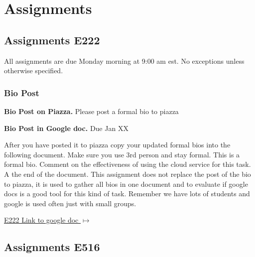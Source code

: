 \chapter{Assignments}\label{c:assignments}

\section{Assignments E222}
\label{s:e222-assignments}

All assignments are due Monday morning at 9:00 am est. No exceptions unless otherwise specified.  

\subsection{Bio Post}

\begin{exercise}\label{a:e222-bio-piazza}

{\bf Bio Post on Piazza.} Please post a formal bio to piazza

\end{exercise}
 
\begin{exercise} \label{a:e222-bio-googledocs}

{\bf Bio Post in Google doc.} Due Jan XX

After you have posted it to piazza copy your updated formal bios into the following document.  Make sure you use 3rd person and stay formal. This is a formal bio. Comment on the effectiveness of using the cloud service for this task. A the end of the document. This assignment does not replace the post of the bio to piazza, it is used to gather all bios in one document and to evaluate if google docs is a good tool for this kind of task. Remember we have lots of students and google is used often just with small groups.
 
 \smallskip

 {\hfill \href{https://docs.google.com/document/d/1ejzlKYqC3dLac8WXVpcPQsJh1j4BDqRxxgGg1cFQbeQ/edit?usp=sharing}{E222 Link to google doc $\mapsto$}}

\end{exercise}

\section{Assignments E516}\label{s:e516-assignments}

